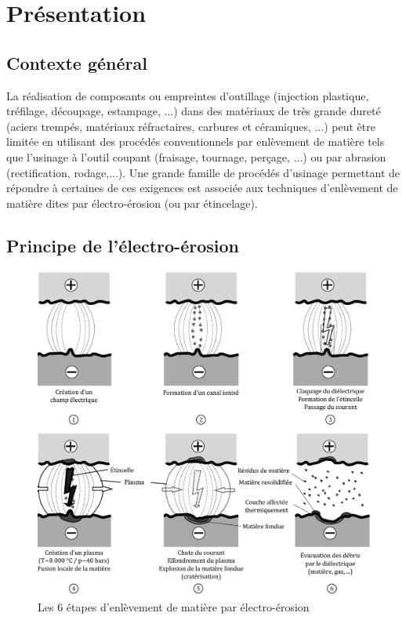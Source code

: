 

\section{Présentation}

\subsection{Contexte général}

La réalisation de composants ou empreintes d'outillage (injection plastique, tréfilage, découpage, estampage, ...) dans des matériaux de très grande dureté (aciers trempés, matériaux réfractaires, carbures et céramiques, ...) peut être limitée en utilisant des procédés conventionnels par enlèvement de matière tels que l'usinage à l'outil coupant (fraisage, tournage, perçage, ...) ou par abrasion (rectification, rodage,...). Une grande famille de procédés d'usinage permettant de répondre à certaines de ces exigences est associée aux techniques d'enlèvement de matière dites par électro-érosion (ou par
étincelage).

\subsection{Principe de l'électro-érosion}

\begin{figure}[!h]
 \centering\includegraphics[width=0.8\linewidth]{img/img01}
 \caption{Les 6 étapes d'enlèvement de matière par électro-érosion}
 \label{img01}
\end{figure}

